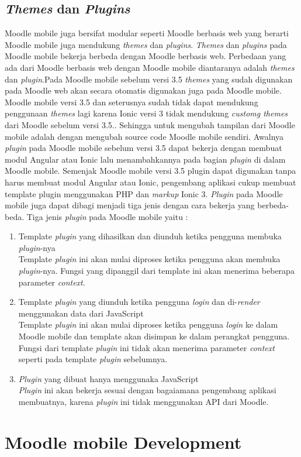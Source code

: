 \subsection{\textit{Themes} dan \textit{Plugins}}
Moodle mobile juga bersifat modular seperti Moodle berbasis web yang berarti Moodle mobile juga mendukung \textit{themes} dan \textit{plugins}. \textit{Themes} dan \textit{plugins} pada Moodle mobile bekerja berbeda dengan Moodle berbasis web. Perbedaan yang ada dari Moodle berbasis web dengan Moodle mobile diantaranya adalah \textit{themes} dan \textit{plugin}.Pada Moodle mobile sebelum versi 3.5 \textit{themes} yang sudah digunakan pada Moodle web akan secara otomatis digunakan juga pada Moodle mobile. Moodle mobile versi 3.5 dan seterusnya sudah tidak dapat mendukung penggunaan \textit{themes} lagi karena Ionic versi 3 tidak mendukung \textit{customg themes} dari Moodle sebelum versi 3.5.\cite{Moodlemobile:themes}. Sehingga untuk mengubah tampilan dari Moodle mobile adalah dengan mengubah source code Moodle mobile sendiri. Awalnya \textit{plugin} pada Moodle mobile sebelum versi 3.5 dapat bekerja dengan membuat modul Angular atau Ionic lalu menambahkannya pada bagian \textit{plugin} di dalam Moodle mobile. Semenjak Moodle mobile versi 3.5 plugin dapat digunakan tanpa harus membuat modul Angular atau Ionic, pengembang aplikasi cukup membuat template plugin menggunakan PHP dan \textit{markup} Ionic 3\cite{Moodlemobile:plugin}. \textit{Plugin} pada Moodle mobile juga dapat dibagi menjadi tiga jenis dengan cara bekerja yang berbeda-beda. Tiga jenis \textit{plugin} pada Moodle mobile yaitu :

	\begin{enumerate}
	\item Template \textit{plugin} yang dihasilkan dan diunduh ketika pengguna membuka \textit{plugin}-nya\\
		Template \textit{plugin} ini akan mulai diproses ketika pengguna akan membuka \textit{plugin}-nya. Fungsi yang dipanggil dari template ini akan menerima beberapa parameter \textit{context}.
		
	\item Template \textit{plugin} yang diunduh ketika pengguna \textit{login} dan di-\textit{render} menggunakan data dari JavaScript \\
		Template \textit{plugin} ini  akan mulai diproses ketika pengguna \textit{login} ke dalam Moodle mobile dan template akan disimpan ke dalam perangkat pengguna. Fungsi dari template \textit{plugin} ini tidak akan menerima parameter \textit{context} seperti pada template \textit{plugin} sebelumnya.
	\item \textit{Plugin} yang dibuat hanya menggunaka JavaScript \\
		\textit{Plugin} ini akan bekerja sesuai dengan bagaiamana pengembang aplikasi membuatnya, karena \textit{plugin} ini tidak menggunakan API dari Moodle.
	

	
	\end{enumerate}

\section{Moodle mobile Development}
\label{sec:MoodleAppDev}